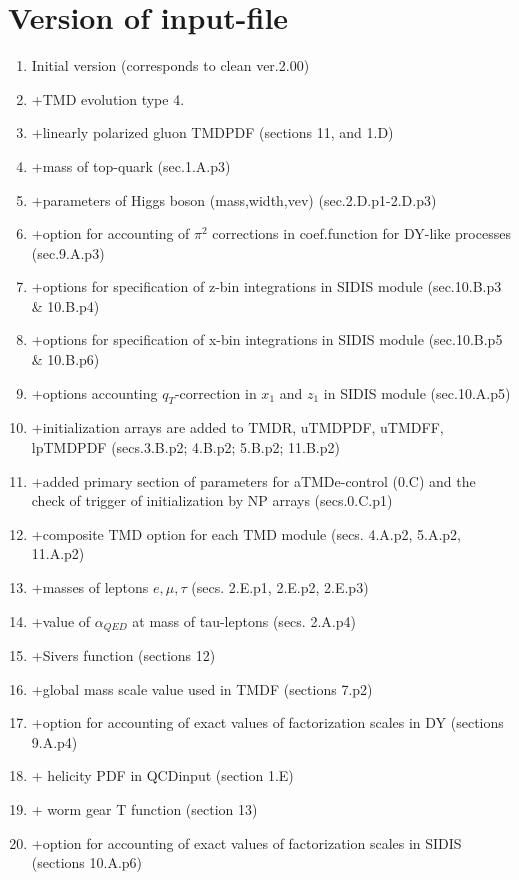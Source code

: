 \documentclass[prd,nofootinbib,eqsecnum,final]{revtex4}
\renewcommand{\(}{\left(}
\renewcommand{\)}{\right)}
\renewcommand{\[}{\left[}
\renewcommand{\]}{\right]}
\begin{document}
\section{Version of input-file}
\begin{enumerate}
\item Initial version (corresponds to clean ver.2.00)
\item +TMD evolution type 4.
\item +linearly polarized gluon TMDPDF (sections 11, and 1.D)
\item +mass of top-quark (sec.1.A.p3)
\item +parameters of Higgs boson (mass,width,vev) (sec.2.D.p1-2.D.p3)
\item +option for accounting of $\pi^2$ corrections in coef.function for DY-like processes (sec.9.A.p3)
\item +options for specification of z-bin integrations in SIDIS module (sec.10.B.p3 \& 10.B.p4)
\item +options for specification of x-bin integrations in SIDIS module (sec.10.B.p5 \& 10.B.p6)
\item +options accounting $q_T$-correction in $x_1$ and $z_1$ in SIDIS module (sec.10.A.p5)
\item +initialization arrays are added to TMDR, uTMDPDF, uTMDFF, lpTMDPDF (secs.3.B.p2; 4.B.p2; 5.B.p2; 11.B.p2)
\item +added primary section of parameters for aTMDe-control (0.C) and the check of trigger of initialization by NP arrays (secs.0.C.p1)
\item +composite TMD option for each TMD module (secs. 4.A.p2, 5.A.p2, 11.A.p2)
\item +masses of leptons $e,\mu,\tau$ (secs. 2.E.p1, 2.E.p2, 2.E.p3)
\item +value of $\alpha_{QED}$ at mass of tau-leptons (secs. 2.A.p4)
\item +Sivers function (sections 12)
\item +global mass scale value used in TMDF (sections 7.p2)
\item +option for accounting of exact values of factorization scales in DY (sections 9.A.p4)
\item + helicity PDF in QCDinput (section 1.E)
\item + worm gear T function (section 13)
\item +option for accounting of exact values of factorization scales in SIDIS (sections 10.A.p6)
\end{enumerate}
\end{document}
